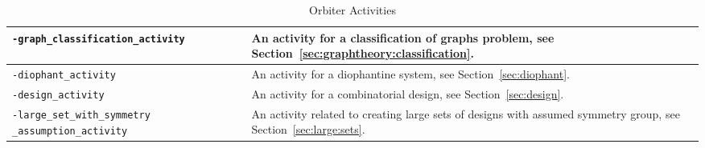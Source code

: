 \begin{table}
\begin{center}
\begin{tabular}{|p{7cm}|p{7cm}|}
		\hline
		\verb'-graph_classification_activity' &  
		An activity for a classification of graphs problem,  
		see Section~\ref{sec:graphtheory:classification}.\\
		\hline
		\verb'-diophant_activity' &  
		An activity for a diophantine system,  
		see Section~\ref{sec:diophant}.\\
		\hline
		\verb'-design_activity' &  
		An activity for a combinatorial design,  
		see Section~\ref{sec:design}.\\
		\hline
		\verb'-large_set_with_symmetry' \verb'_assumption_activity' &  
		An activity related to creating large sets 
		of designs with assumed symmetry group, 
		see Section~\ref{sec:large:sets}. \\
		\hline
		\end{tabular}
	\end{center}
	\caption{\label{tab:activities}Orbiter Activities}
\end{table}

